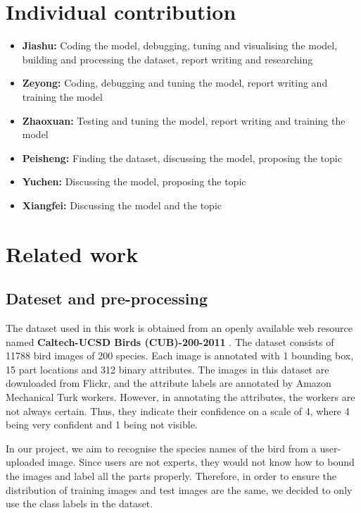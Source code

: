 \documentclass[letterpaper, 12pt]{article}
\begin{document}
\section{Individual contribution}
\begin{itemize}
    \item \textbf{Jiashu:} Coding the model, debugging, tuning and visualising the model, building and processing the dataset, report writing and researching
    \item \textbf{Zeyong:} Coding, debugging and tuning the model, report writing and training the model
    \item \textbf{Zhaoxuan:} Testing and tuning the model, report writing and training the model
    \item \textbf{Peisheng:} Finding the dataset, discussing the model, proposing the topic
    \item \textbf{Yuchen:} Discussing the model, proposing the topic
    \item \textbf{Xiangfei:} Discussing the model and the topic
\end{itemize}

\section{Related work}
\subsection{Dateset and pre-processing}
The dataset used in this work is obtained from an openly available web resource named
\textbf{Caltech-UCSD Birds (CUB)-200-2011} \cite{WahCUB_200_2011}.
The dataset consists of 11788 bird images of 200 species. Each image is annotated with 1
bounding box, 15 part locations and 312 binary attributes. The images in this dataset are
downloaded from Flickr, and the attribute labels are annotated by Amazon Mechanical Turk workers.
However, in annotating the attributes, the workers are not always certain. Thus, they indicate their
confidence on a scale of 4, where 4 being very confident and 1 being not visible.

In our project, we aim to recognise the species names of the bird from a user-uploaded image.
Since users are not experts, they would not know how to bound the images and label all the parts properly.
Therefore, in order to ensure the distribution of training images and test images are the same, we decided
to only use the class labels in the dataset.
\end{document}
